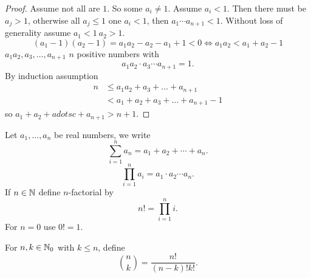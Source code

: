 \documentclass[10pt, a4paper]{article}
\begin{document}
\begin{example}
\begin{enumerate}[label = (\alph*)]
\begin{proof}
        Assume not all are $1$. So some $a_i \neq 1$. Assume $a_i < 1$. Then there must be $a_j > 1$, otherwise all $a_j \leq 1$ one $a_i < 1$, then $a_1 \dotsi a_{n + 1} < 1$. Without loss of generality assume $a_1 < 1\ a_2 > 1$.
        \[
        (a_1 - 1)(a_2 - 1) = a_1 a_2 - a_2 - a_1 + 1 < 0 \iff a_1 a_2 < a_1 + a_2 - 1
        \]
        $a_1 a_2, a_3, \dotsc, a_{n + 1}$ $n$ positive numbers with
        \[
        a_1 a_2 \cdot a_3 \dotsi a_{n + 1} = 1.
        \]
        By induction assumption
        \begin{align*}
            n &\leq a_1a_2 + a_3 + \dotsc + a_{n + 1} \\
            &< a_1 + a_2 + a_3 + \dotsc + a_{n + 1} - 1            
        \end{align*}
        so $a_1 + a_2 + adotsc + a_{n + 1} > n + 1$.
    \end{proof}
    \end{enumerate}
\end{example}

Let $a_1, \dotsc, a_n$ be real numbers, we write
\[
\sum_{i = 1}^{n}a_n = a_1 + a_2 + \dotsi + a_n.
\]
\[
\prod_{i = 1}^{n}a_i = a_1 \cdot a_2 \dotsi a_n.
\]
If $n \in \mathbb{N}$ define $n$-factorial by
\[
n! = \prod_{i = 1}^{n}i.
\]
For $n = 0$ use $0! = 1$.

\begin{definition}
    For $n, k \in \mathbb{N}_0$ with $k \leq n$, define
    \[
    \binom{n}{k} = \frac{n!}{(n - k)!k!}.
    \]
\end{definition}
\end{document}
